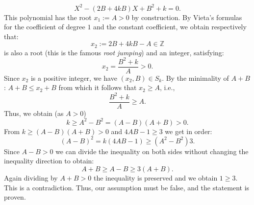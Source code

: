 \begin{solution}
    \[
        X^{2} - \left(2B + 4kB\right)X + B^{2} + k = 0.
    \]
    This polynomial has the root \( x_1 := A > 0 \) by construction. By Vieta's formulas for the coefficient of degree \( 1 \) and the constant coefficient, we obtain respectively that:
    \[
        x_2 := 2B + 4kB - A \in \mathbb{Z}
    \]
    is also a root (this is the famous \textit{root jumping}) and an integer, satisfying:
    \[
        x_2 = \frac{B^{2} + k}{A} > 0.
    \]
    Since \( x_2 \) is a positive integer, we have \( \left(x_2, B\right) \in S_k \). By the minimality of \( A + B \): \( A + B \leq x_2 + B \) from which it follows that \( x_2 \geq A \), i.e.,
    \[
        \frac{B^{2} + k}{A} \geq A.
    \]
    Thus, we obtain (as \( A>0 \))
    \[
        k \geq A^{2} - B^{2} = \left(A - B\right)\left(A + B\right)>0.
    \]
    From \( k\geq \left(A - B\right)\left(A + B\right)>0 \) and \( 4AB-1\geq 3 \) we get in order:
    \[
        \left(A - B\right)^{2} = k\left(4AB - 1\right)\geq \left(A^{2} - B^{2}\right)3.
    \]
    Since \( A-B>0 \) we can divide the inequality on both sides without changing the inequality direction to obtain:
    \[
        A + B \geq A - B \geq 3\left(A + B\right).
    \]
    Again dividing by \( A+B>0 \) the inequality is preserved and we obtain \( 1 \geq 3 \). This is a contradiction. Thus, our assumption must be false, and the statement is proven.
\end{solution}
